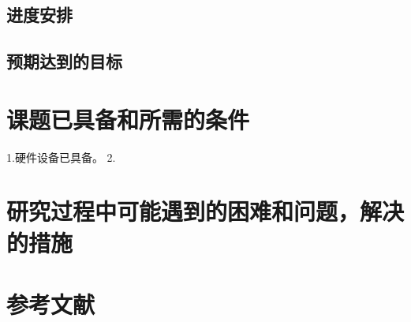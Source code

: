 \subsection{进度安排}
\subsection{预期达到的目标}
\section{课题已具备和所需的条件}
1.硬件设备已具备。 
2.
\section{研究过程中可能遇到的困难和问题，解决的措施}

\section{参考文献}



